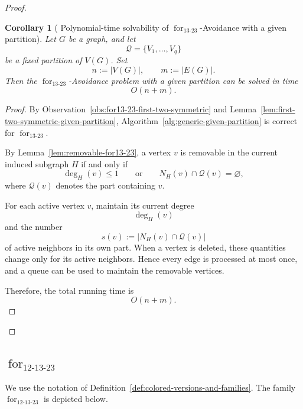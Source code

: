 \documentclass[12pt]{article}
\theoremstyle{plain}
\newtheorem{corollary}[theorem]{Corollary}
\theoremstyle{definition}
\theoremstyle{remark}
\theoremstyle{definition}
\newcommand{\forlabel}{\mathrm{for}}
\DeclareRobustCommand{\forparam}[1]{%
  \ensuremath{\mathop{\forlabel}\nolimits_{#1}}%
}
\begin{document}
\begin{proof}
\begin{corollary}[
Polynomial-time solvability of
\texorpdfstring{\(\forparam{13\text{-}23}\)-Avoidance with a given partition}
{for13-23-Avoidance with a given partition}
]
\label{cor:for13-23-given-partition-polynomial}
Let \(G\) be a graph, and let
\[
\mathcal Q=\{V_1,\dots,V_q\}
\]
be a fixed partition of \(V(G)\). Set
\[
n:=|V(G)|,
\qquad
m:=|E(G)|.
\]
Then the \(\forparam{13\text{-}23}\)-Avoidance problem with a given
partition can be solved in time
\[
O(n+m).
\]
\end{corollary}

\begin{proof}
By Observation~\ref{obs:for13-23-first-two-symmetric} and
Lemma~\ref{lem:first-two-symmetric-given-partition},
Algorithm~\ref{alg:generic-given-partition} is correct for
\(\forparam{13\text{-}23}\).

By Lemma~\ref{lem:removable-for13-23}, a vertex \(v\) is removable in the
current induced subgraph \(H\) if and only if
\[
\deg_H(v)\le1
\qquad\text{or}\qquad
N_H(v)\cap\mathcal Q(v)=\varnothing,
\]
where \(\mathcal Q(v)\) denotes the part containing \(v\).

For each active vertex \(v\), maintain its current degree
\[
\deg_H(v)
\]
and the number
\[
s(v):=|N_H(v)\cap\mathcal Q(v)|
\]
of active neighbors in its own part. When a vertex is deleted, these
quantities change only for its active neighbors. Hence every edge is
processed at most once, and a queue can be used to maintain the removable
vertices.

Therefore, the total running time is
\[
O(n+m).
\]
\end{proof}







\end{proof}












\subsection{
\texorpdfstring{\(\forparam{12\text{-}13\text{-}23}\)}
{for12-13-23}
}
\label{subsec:for12-13-23}

We use the notation of
Definition~\ref{def:colored-versions-and-families}.
The family \(\forparam{12\text{-}13\text{-}23}\) is depicted below.
\end{document}
